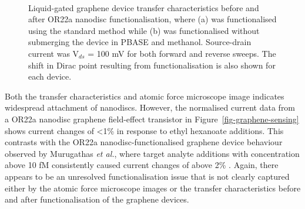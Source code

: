 \documentclass[
  a4paper,
]{scrbook}
\begin{document}
\begin{figure}
\begin{minipage}[t]{0.45\linewidth}
{{}

}

\end{minipage}%
%
\begin{minipage}[t]{0.01\linewidth}

{\centering 

~

}

\end{minipage}%

\caption{\label{fig-graphene-sensing-TX}Liquid-gated graphene device
transfer characteristics before and after OR22a nanodisc
functionalisation, where (a) was functionalised using the standard
method while (b) was functionalised without submerging the device in
PBASE and methanol. Source-drain current was V\(_{ds}\) = 100 mV for
both forward and reverse sweeps. The shift in Dirac point resulting from
functionalisation is also shown for each device.}

\end{figure}

Both the transfer characteristics and atomic force microscope image
indicates widespread attachment of nanodiscs. However, the normalised
current data from a OR22a nanodisc graphene field-effect transistor in
Figure~\ref{fig-graphene-sensing} shows current changes of \textless1\%
in response to ethyl hexanoate additions. This contrasts with the OR22a
nanodisc-functionalised graphene device behaviour observed by Murugathas
\emph{et al.}, where target analyte additions with concentration above
10 fM consistently caused current changes of above 2\%
\autocite{Murugathas2020}. Again, there appears to be an unresolved
functionalisation issue that is not clearly captured either by the
atomic force microscope images or the transfer characteristics before
and after functionalisation of the graphene devices.
\end{document}
